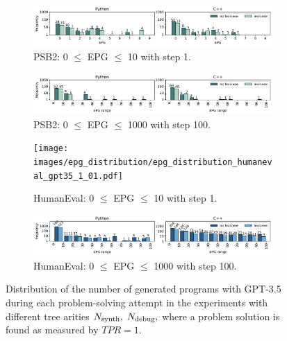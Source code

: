 \begin{figure}[H]
\begin{subfigure}{.9\columnwidth}
\centering
\includegraphics[width=\linewidth, trim={0mm 4mm 0mm 0mm}]{images/epg_distribution_psb2_gpt35_1_01.pdf}
  \caption{PSB2: 0 $\leq$ EPG $\leq$ 10 with step 1.}
  \label{fig:psb2-epg-distrib-step-1}
\end{subfigure}
% 
% 
\begin{subfigure}{.9\columnwidth}
\centering
\includegraphics[width=\linewidth, trim={0mm 4mm 0mm 0mm}]{images/epg_distribution_psb2_gpt35_10_01.pdf}
  \caption{PSB2: 0 $\leq$ EPG $\leq$ 1000 with step 100.}
  \label{fig:psb2-epg-distrib-step-10}
\end{subfigure}
% 
\begin{subfigure}{.9\columnwidth}
\centering
\texttt{[image: images/epg\_distribution/epg\_distribution\_humaneval\_gpt35\_1\_01.pdf]}
  \caption{HumanEval: 0 $\leq$ EPG $\leq$ 10 with step 1.}
  \label{fig:humaneval-epg-distrib-step-1}
\end{subfigure}
% 
\begin{subfigure}{.9\columnwidth}
\centering
\includegraphics[width=\linewidth, trim={0mm 4mm 0mm 0mm}]{images/epg_distribution_humaneval_gpt35_10_01.pdf}
  \caption{HumanEval: 0 $\leq$ EPG $\leq$ 1000 with step 100.}
  \label{fig:humaneval-epg-distrib-step-10}
\end{subfigure}
\caption{Distribution of the number of generated programs with GPT-3.5 during each problem-solving attempt in the experiments with different tree arities $N_\text{synth}{}, \; N_\text{debug}{},$ where a problem solution is found as measured by $TPR=1.$}
\label{fig:epg-distribution}
\end{figure}

